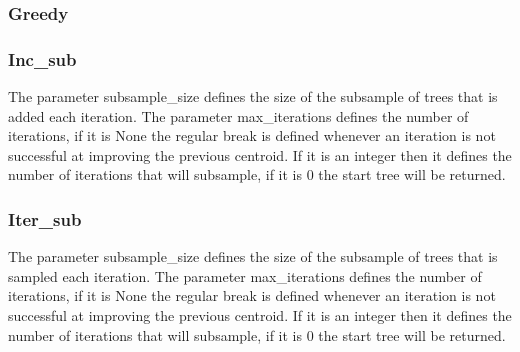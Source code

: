 \documentclass[letterpaper,10pt,english]{sphinxmanual}
\begin{document}
\subsubsection{Greedy}
\label{\detokenize{summary:greedy}}\label{\detokenize{summary:var-greedy}}
\begin{sphinxVerbatim}[commandchars=\\\{\}]
  
  
\end{sphinxVerbatim}


\subsubsection{Inc\_sub}
\label{\detokenize{summary:inc-sub}}\label{\detokenize{summary:var-incsub}}
\sphinxAtStartPar
The parameter subsample\_size defines the size of the subsample of trees that is added each iteration.
The parameter max\_iterations defines the number of iterations, if it is None the regular break is defined whenever an
iteration is not successful at improving the previous centroid.
If it is an integer then it defines the number of iterations that will subsample, if it is 0 the start tree will be returned.

\begin{sphinxVerbatim}[commandchars=\\\{\}]
  
\end{sphinxVerbatim}


\subsubsection{Iter\_sub}
\label{\detokenize{summary:iter-sub}}\label{\detokenize{summary:var-itersub}}
\sphinxAtStartPar
The parameter subsample\_size defines the size of the subsample of trees that is sampled each iteration.
The parameter max\_iterations defines the number of iterations, if it is None the regular break is defined whenever an
iteration is not successful at improving the previous centroid.
If it is an integer then it defines the number of iterations that will subsample, if it is 0 the start tree will be returned.
\end{document}
